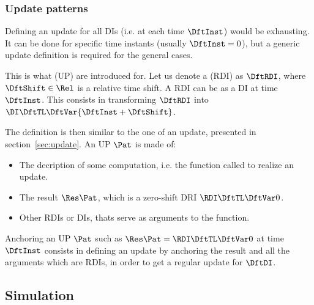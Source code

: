 \subsubsection{Update patterns \label{sec:pattern}}

Defining an update for all DIs (i.e. at each time $\DftInst$) would be exhausting. It can be done for specific time instants (usually $\DftInst=0$), but a generic update definition is required for the general cases.

This is what  (UP) are introduced for. Let us denote a  (RDI) as $\DftRDI$, where $\DftShift \in \Rel$ is a relative time shift. A RDI can be  as a DI at time $\DftInst$. This consists in transforming $\DftRDI$ into $\DI\DftTL\DftVar{\DftInst+\DftShift}$.

The definition is then similar to the one of an update, presented in section~\ref{sec:update}.
An UP $\Pat$ is made of:
\begin{itemize}
\item The decription of some computation, i.e. the function called to realize an update.
\item The result $\Res\Pat$, which is a zero-shift DRI $\RDI\DftTL\DftVar 0$.
\item Other RDIs or DIs, thats serve as arguments to the function.
\end{itemize}

Anchoring an UP $\Pat$ such as $\Res\Pat = \RDI\DftTL\DftVar 0$ at time $\DftInst$ consists in defining an update by anchoring the result and all the arguments which are RDIs, in order to get a regular update for $\DftDI$.

\subsection{Simulation}

